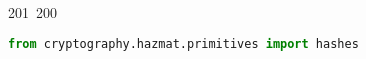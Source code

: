 201~200~\documentclass{article}
\begin{document}
\begin{lstlisting}[language=Python, caption=Signing and Verifying Messages]
	                                                                                                                                                                                                                                                                                                	                                                                                                                                        	    	                                                                                                	                                                                                                                                                                                                                                                                                                                                	                                                                        	                                                                        	                                                                                                                                        	                                                                                                                                                                                                                        	                                                                                                from cryptography.hazmat.primitives import hashes


\end{lstlisting}
\end{document}
